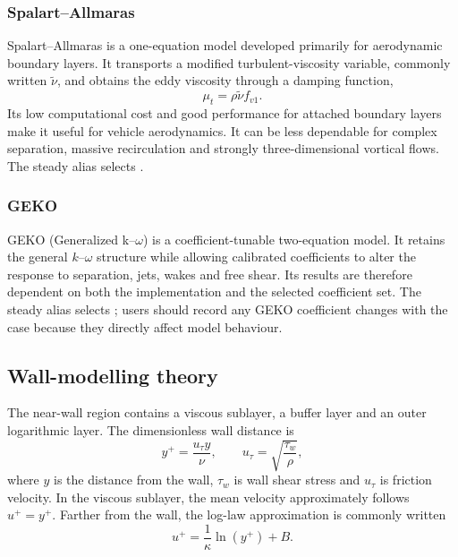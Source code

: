 \subsubsection{Spalart--Allmaras}

Spalart--Allmaras is a one-equation model developed primarily for aerodynamic boundary layers. It transports a modified turbulent-viscosity variable, commonly written $\widetilde{\nu}$, and obtains the eddy viscosity through a damping function,
\begin{equation}
    \mu_t = \rho\widetilde{\nu} f_{v1}.
\end{equation}
Its low computational cost and good performance for attached boundary layers make it useful for vehicle aerodynamics. It can be less dependable for complex separation, massive recirculation and strongly three-dimensional vortical flows. The steady alias  selects .

\subsubsection{GEKO}

GEKO (Generalized k--$\omega$) is a coefficient-tunable two-equation model. It retains the general $k$--$\omega$ structure while allowing calibrated coefficients to alter the response to separation, jets, wakes and free shear. Its results are therefore dependent on both the implementation and the selected coefficient set. The steady alias  selects ; users should record any GEKO coefficient changes with the case because they directly affect model behaviour.

\subsection{Wall-modelling theory}

The near-wall region contains a viscous sublayer, a buffer layer and an outer logarithmic layer. The dimensionless wall distance is
\begin{equation}
    y^+ = \frac{u_\tau y}{\nu},
    \qquad
    u_\tau = \sqrt{\frac{\tau_w}{\rho}},
\end{equation}
where $y$ is the distance from the wall, $\tau_w$ is wall shear stress and $u_\tau$ is friction velocity. In the viscous sublayer, the mean velocity approximately follows $u^+=y^+$. Farther from the wall, the log-law approximation is commonly written
\begin{equation}
    u^+ = \frac{1}{\kappa}\ln(y^+) + B.
\end{equation}

